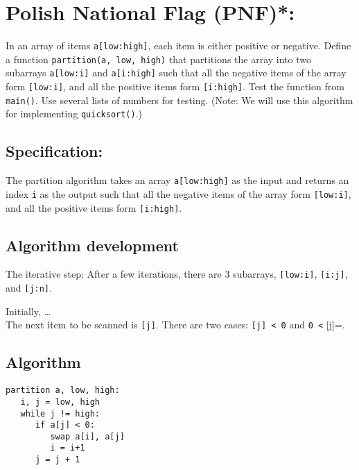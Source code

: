 \documentclass[11pt]{article}
\begin{document}
\section{Polish National Flag (PNF)*:}
\label{sec-3}
In an array of items \texttt{a[low:high]},
each item is either positive or negative. Define a function
\texttt{partition(a, low, high)} that partitions the array into two
subarrays \texttt{a[low:i]} and \texttt{a[i:high]} such that all the negative
items of the array form \texttt{[low:i]}, and all the positive items form
\texttt{[i:high]}. Test the function from \texttt{main()}. Use several lists of
numbers for testing. (Note: We will use this algorithm for
implementing \texttt{quicksort()}.)

\subsection*{Specification:}
\label{sec-3-1}
The partition algorithm takes an array
\texttt{a[low:high]} as the input and returns an index \texttt{i} as
the output such that all the negative items of the array
form \texttt{[low:i]}, and all the positive items form
\texttt{[i:high]}.

\subsection*{Algorithm development}
\label{sec-3-2}
The iterative step:
After a few iterations, there are 3 subarrays, \texttt{[low:i]},
\texttt{[i:j]}, and \texttt{[j:n]}.

Initially, \ldots{}\\

The next item to be scanned is \texttt{[j]}.  There are two
cases: \texttt{[j] < 0} and \texttt{0 <} [j]=.

\subsection*{Algorithm}
\label{sec-3-3}
\begin{verbatim}
partition a, low, high:
   i, j = low, high
   while j != high:
      if a[j] < 0:
         swap a[i], a[j]
         i = i+1
      j = j + 1
\end{verbatim}

\linespread{1}
\end{document}
